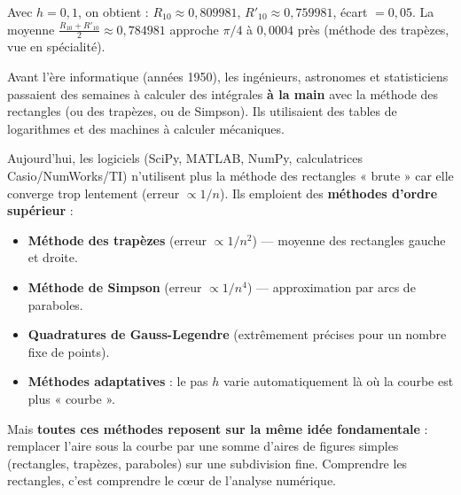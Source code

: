 \documentclass[11pt]{article}
\newcounter{popsec}
\newcounter{popsub}
\newcommand{\courssub}[1]{%
  \stepcounter{popsub}%
  \par\vspace{9pt}\noindent{\popxbold\fontsize{11.5}{13}\selectfont\color{popink}{\color{poporange}\thepopsec.\thepopsub}\hspace{6pt}#1}\par\nopagebreak\vspace{4pt}
}
\begin{document}
\begin{exemplebox}[Même exemple avec $n=10$ (calculatrice / tableur)]
Avec $h=0,1$, on obtient :
$R_{10} \approx 0,809981$, $R'_{10} \approx 0,759981$, écart $=0,05$.
La moyenne $\frac{R_{10}+R'_{10}}{2} \approx 0,784981$ approche $\pi/4$ à $0,0004$ près (méthode des trapèzes, vue en spécialité).
\end{exemplebox}

\courssub{Le savais-tu ?}

\begin{savaistu}
Avant l'ère informatique (années 1950), les ingénieurs, astronomes et statisticiens passaient des semaines à calculer des intégrales \textbf{à la main} avec la méthode des rectangles (ou des trapèzes, ou de Simpson). Ils utilisaient des tables de logarithmes et des machines à calculer mécaniques. 

Aujourd'hui, les logiciels (SciPy, MATLAB, NumPy, calculatrices Casio/NumWorks/TI) n'utilisent plus la méthode des rectangles « brute » car elle converge trop lentement (erreur $\propto 1/n$). Ils emploient des \textbf{méthodes d'ordre supérieur} :
\begin{itemize}
    \item \textbf{Méthode des trapèzes} (erreur $\propto 1/n^2$) — moyenne des rectangles gauche et droite.
    \item \textbf{Méthode de Simpson} (erreur $\propto 1/n^4$) — approximation par arcs de paraboles.
    \item \textbf{Quadratures de Gauss-Legendre} (extrêmement précises pour un nombre fixe de points).
    \item \textbf{Méthodes adaptatives} : le pas $h$ varie automatiquement là où la courbe est plus « courbe ».
\end{itemize}
Mais \textbf{toutes ces méthodes reposent sur la même idée fondamentale} : remplacer l'aire sous la courbe par une somme d'aires de figures simples (rectangles, trapèzes, paraboles) sur une subdivision fine. Comprendre les rectangles, c'est comprendre le cœur de l'analyse numérique.
\end{savaistu}
\end{document}
